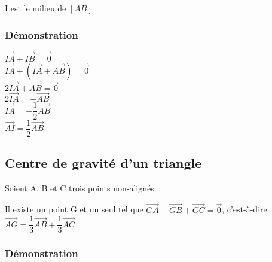 I est le milieu de $\left[AB\right]$


\subsubsection{Démonstration}

$\overrightarrow{IA} + \overrightarrow{IB} = \overrightarrow{0} $\\

$ \overrightarrow{IA} + \left(\overrightarrow{IA} + \overrightarrow{AB}\right) = \overrightarrow{0} $\\

$ 2\overrightarrow{IA} + \overrightarrow{AB} = \overrightarrow{0} $\\

$ 2\overrightarrow{IA} = -\overrightarrow{AB} $\\

$\overrightarrow{IA} = -\dfrac{1}{2} \overrightarrow{AB} $\\

$ \overrightarrow{AI} = \dfrac{1}{2} \overrightarrow{AB} $\\

\newpage 

\subsection{Centre de gravité d'un triangle}

Soient A, B et C trois points non-alignés.

Il existe un point G et un seul tel que $\overrightarrow{GA} + \overrightarrow{GB} + \overrightarrow{GC} = \overrightarrow{0} $, c'est-à-dire $\overrightarrow{AG} = \dfrac{1}{3} \overrightarrow{AB} + \dfrac{1}{3} \overrightarrow{AC} $ \\

\subsubsection{Démonstration}

